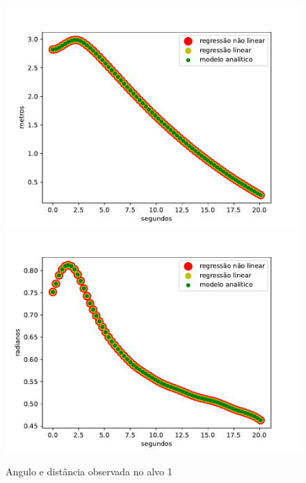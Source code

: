 \begin{figure}[H]
    \centering
    \includegraphics[scale=0.45]{figuras/distance_over_time_1.pdf}
    \includegraphics[scale=0.45]{figuras/angle_over_time_1.pdf}
    \caption{Angulo e distância observada no alvo 1}
\end{figure}

